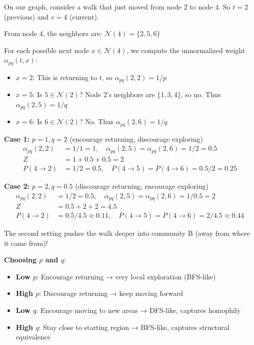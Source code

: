 \begin{notechapter}
\begin{example}
On our graph, consider a walk that just moved from node 2 to node 4. So $t = 2$ (previous) and $v = 4$ (current).

From node 4, the neighbors are: $\mathcal{N}(4) = \{2, 5, 6\}$

For each possible next node $x \in \mathcal{N}(4)$, we compute the unnormalized weight $\alpha_{pq}(t, x)$:
\begin{itemize}
    \item $x = 2$: This is returning to $t$, so $\alpha_{pq}(2, 2) = 1/p$
    \item $x = 5$: Is $5 \in \mathcal{N}(2)$? Node 2's neighbors are $\{1, 3, 4\}$, so no. Thus $\alpha_{pq}(2, 5) = 1/q$
    \item $x = 6$: Is $6 \in \mathcal{N}(2)$? No. Thus $\alpha_{pq}(2, 6) = 1/q$
\end{itemize}

\textbf{Case 1:} $p=1, q=2$ (encourage returning, discourage exploring)
\begin{align*}
\alpha_{pq}(2,2) &= 1/1 = 1, \quad \alpha_{pq}(2,5) = \alpha_{pq}(2,6) = 1/2 = 0.5 \\
Z &= 1 + 0.5 + 0.5 = 2 \\
P(4 \to 2) &= 1/2 = 0.5, \quad P(4 \to 5) = P(4 \to 6) = 0.5/2 = 0.25
\end{align*}

\textbf{Case 2:} $p=2, q=0.5$ (discourage returning, encourage exploring)
\begin{align*}
\alpha_{pq}(2,2) &= 1/2 = 0.5, \quad \alpha_{pq}(2,5) = \alpha_{pq}(2,6) = 1/0.5 = 2 \\
Z &= 0.5 + 2 + 2 = 4.5 \\
P(4 \to 2) &= 0.5/4.5 \approx 0.11, \quad P(4 \to 5) = P(4 \to 6) = 2/4.5 \approx 0.44
\end{align*}

The second setting pushes the walk deeper into community B (away from where it came from)!
\end{example}

\begin{keyinsight}
\textbf{Choosing $p$ and $q$}:
\begin{itemize}
    \item \textbf{Low $p$}: Encourage returning → very local exploration (BFS-like)
    \item \textbf{High $p$}: Discourage returning → keep moving forward
    \item \textbf{Low $q$}: Encourage moving to new areas → DFS-like, captures homophily
    \item \textbf{High $q$}: Stay close to starting region → BFS-like, captures structural equivalence
\end{itemize}


\end{keyinsight}
\end{notechapter}
